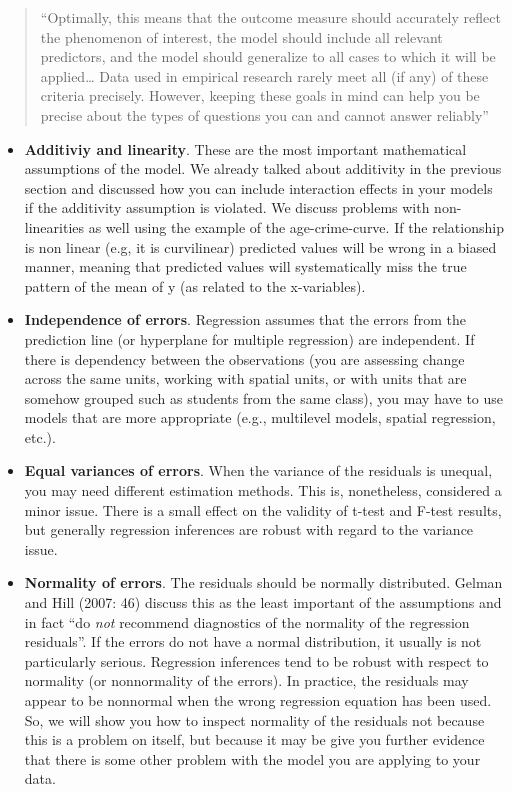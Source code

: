 \documentclass[
]{book}
\begin{document}
\begin{quote}
``Optimally, this means that the outcome measure should accurately reflect the phenomenon of interest, the model should include all relevant predictors, and the model should generalize to all cases to which it will be applied\ldots{} Data used in empirical research rarely meet all (if any) of these criteria precisely. However, keeping these goals in mind can help you be precise about the types of questions you can and cannot answer reliably''
\end{quote}

\begin{itemize}
\item
  \textbf{Additiviy and linearity}. These are the most important mathematical assumptions of the model. We already talked about additivity in the previous section and discussed how you can include interaction effects in your models if the additivity assumption is violated. We discuss problems with non-linearities as well using the example of the age-crime-curve. If the relationship is non linear (e.g, it is curvilinear) predicted values will be wrong in a biased manner, meaning that predicted values will systematically miss the true pattern of the mean of y (as related to the x-variables).
\item
  \textbf{Independence of errors}. Regression assumes that the errors from the prediction line (or hyperplane for multiple regression) are independent. If there is dependency between the observations (you are assessing change across the same units, working with spatial units, or with units that are somehow grouped such as students from the same class), you may have to use models that are more appropriate (e.g., multilevel models, spatial regression, etc.).
\item
  \textbf{Equal variances of errors}. When the variance of the residuals is unequal, you may need different estimation methods. This is, nonetheless, considered a minor issue. There is a small effect on the validity of t-test and F-test results, but generally regression inferences are robust with regard to the variance issue.
\item
  \textbf{Normality of errors}. The residuals should be normally distributed. Gelman and Hill (2007: 46) discuss this as the least important of the assumptions and in fact ``do \emph{not} recommend diagnostics of the normality of the regression residuals''. If the errors do not have a normal distribution, it usually is not particularly serious. Regression inferences tend to be robust with respect to normality (or nonnormality of the errors). In practice, the residuals may appear to be nonnormal when the wrong regression equation has been used. So, we will show you how to inspect normality of the residuals not because this is a problem on itself, but because it may be give you further evidence that there is some other problem with the model you are applying to your data.
\end{itemize}
\end{document}
